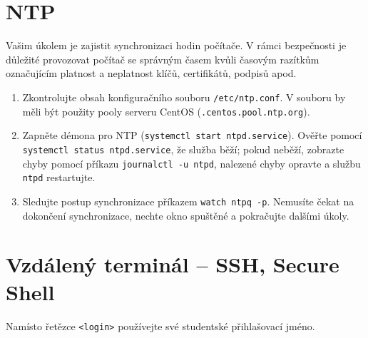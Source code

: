 \documentclass[a4paper,11pt]{article}
\begin{document}
\section{NTP}

Vašim úkolem je zajistit synchronizaci hodin počítače.
V rámci bezpečnosti je důležité provozovat počítač se správným časem kvůli časovým razítkům označujícím platnost a neplatnost klíčů, certifikátů, podpisů apod.

\begin{enumerate}

  \item Zkontrolujte obsah konfiguračního souboru {\tt /etc/ntp.conf}.
    V souboru by měli být použity pooly serveru CentOS ({\tt *.centos.pool.ntp.org}).

  \item Zapněte démona pro NTP ({\tt systemctl start ntpd.service}).
    Ověřte pomocí {\tt systemctl status ntpd.service}, že služba běží;
    pokud neběží, zobrazte chyby pomocí příkazu {\tt journalctl -u ntpd}, nalezené chyby opravte a službu {\tt ntpd} restartujte.

  \item Sledujte postup synchronizace příkazem {\tt watch ntpq -p}.
    Nemusíte čekat na dokončení synchronizace, nechte okno spuštěné a pokračujte dalšími úkoly.

\end{enumerate}

\section{Vzdálený terminál -- SSH, Secure Shell}

Namísto řetězce {\tt <login>} používejte své studentské přihlašovací jméno.
\end{document}

